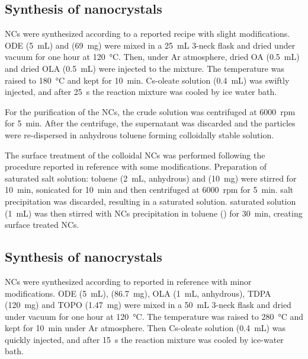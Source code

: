 \documentclass[journal=nalefd, manuscript=letter, layout=twocolumn]{achemso}
\begin{document}
\subsection{Synthesis of  nanocrystals}
 NCs were synthesized according to a reported recipe \cite{Cao2020} with slight modifications. ODE (\SI{5}{mL}) and  (\SI{69}{mg}) were mixed in a \SI{25}{mL} 3-neck flask and dried under vacuum for one hour at \SI{120}{\celsius}. Then, under Ar atmosphere, dried OA (\SI{0.5}{mL}) and dried OLA (\SI{0.5}{mL}) were injected to the mixture. The temperature was raised to \SI{180}{\celsius} and kept for \SI{10}{\minute}. Cs-oleate solution (\SI{0.4}{mL}) was swiftly injected, and after \SI{25}{\second} the reaction mixture was cooled by ice water bath.

For the purification of the NCs, the crude solution was centrifuged at \SI{6000}{rpm} for \SI{5}{\minute}. After the centrifuge, the supernatant was discarded and the particles were re-dispersed in anhydrous toluene forming colloidally stable solution.

The surface treatment of the colloidal  NCs was performed following the procedure reported in reference\cite{Ahmed2018} with some modifications. Preparation of saturated  salt solution: toluene (\SI{2}{mL}, anhydrous) and  (\SI{10}{mg}) were stirred for \SI{10}{\minute}, sonicated for \SI{10}{\minute} and then centrifuged at \SI{6000}{rpm} for \SI{5}{\minute}.  salt precipitation was discarded, resulting in a saturated solution.  saturated solution (\SI{1}{mL}) was then stirred with  NCs precipitation in toluene () for \SI{30}{\minute}, creating surface treated  NCs.

\subsection{Synthesis of  nanocrystals}
 NCs were synthesized according to reported in reference\cite{Pan2020} with minor modifications. ODE (\SI{5}{mL}),  (\SI{86.7}{mg}), OLA (\SI{1}{mL}, anhydrous), TDPA (\SI{120}{mg}) and TOPO (\SI{1.47}{mg}) were mixed in a \SI{50}{mL} 3-neck flask and dried under vacuum for one hour at \SI{120}{\celsius}. The temperature was raised to \SI{280}{\celsius} and kept for \SI{10}{\minute} under Ar atmosphere. Then Cs-oleate solution (\SI{0.4}{mL}) was quickly injected, and after \SI{15}{s} the reaction mixture was cooled by ice-water bath.
\end{document}
